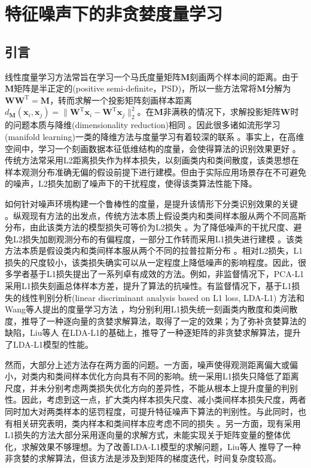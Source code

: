 \chapter{特征噪声下的非贪婪度量学习}\label{chap:2}
\section{引言}
线性度量学习方法常旨在学习一个马氏度量矩阵$\boldsymbol{M}$刻画两个样本间的距离。由于$\boldsymbol{M}$矩阵是半正定的(positive semi-definite，PSD)，所以一些方法常将$\boldsymbol{M}$分解为$\boldsymbol{W}\boldsymbol{W}^\mathrm{T}=\boldsymbol{M}$，转而求解一个投影矩阵刻画样本距离$d_{\boldsymbol{M}}(\boldsymbol{x}_i,\boldsymbol{x}_j)=\|\boldsymbol{W}^\mathrm{T}\boldsymbol{x}_i-\boldsymbol{W}^\mathrm{T}\boldsymbol{x}_j\|_2^2$。在$\boldsymbol{M}$非满秩的情况下，求解投影矩阵$\boldsymbol{W}$时的问题本质与降维(dimensionality reduction)相同 \citep{suvy_DML13,LDR_15jml}。因此很多诸如流形学习(manifold learning)一类的降维方法与度量学习有着较深的联系 \citep{dml_yang}。事实上，在高维空间中，学习一个刻画数据本征低维结构的度量，会使得算法的识别效果更好 \citep{Liao2015,pair17icml}。传统方法常采用L2距离损失作为样本损失，以刻画类内和类间散度，该类思想在样本观测分布准确无偏的假设前提下进行建模。但由于实际应用场景存在不可避免的噪声，L2损失加剧了噪声下的干扰程度，使得该类算法性能下降。

如何针对噪声环境构建一个鲁棒性的度量，是提升该情形下分类识别效果的关键 \citep{Yi2012}。纵观现有方法的出发点，传统方法本质上假设类内和类间样本服从两个不同高斯分布，由此该类方法的模型损失可等价为L2损失 \citep{DavidZhang}。为了降低噪声的干扰尺度、避免L2损失加剧观测分布的有偏程度，一部分工作转而采用L1损失进行建模 \citep{stocL1,niePCAL1}。该类方法本质是假设类内和类间样本服从两个不同的拉普拉斯分布 \citep{zhang2016exploring}。相对L2损失，L1损失的尺度较小，该类损失确实可以从一定程度上降低噪声的影响程度。因此，很多学者基于L1损失提出了一系列卓有成效的方法。例如，非监督情况下，PCA-L1 \citep{pca_L1}采用L1损失刻画总体样本方差，提升了算法的抗噪性。有监督情况下，基于L1损失的线性判别分析(linear discriminant analysis based on L1 loss, LDA-L1) \citep{zhong13}方法和Wang等人提出的度量学习方法 \citep{Wang2014a}，均分别利用L1损失统一刻画类内散度和类间散度，推导了一种逐向量的贪婪求解算法，取得了一定的效果；为了弥补贪婪算法的缺陷，Liu等人 \citep{liu16non}在LDA-L1的基础上，推导了一种逐矩阵的非贪婪求解算法，提升了LDA-L1模型的性能。

然而，大部分上述方法存在两方面的问题。一方面，噪声使得观测距离偏大或偏小，对类内和类间样本优化方向具有不同的影响。统一采用L1损失只降低了距离尺度，并未分别考虑两类损失优化方向的差异性，不能从根本上提升度量的判别性。因此，考虑到这一点，扩大类内样本损失尺度、减小类间样本损失尺度，两者同时加大对两类样本的惩罚程度，可提升特征噪声下算法的判别性。与此同时，也有相关研究表明，类内样本和类间样本应考虑不同的损失 \citep{ye2018lp}。另一方面，现有采用L1损失的方法大部分采用逐向量的求解方式，未能实现关于矩阵变量的整体优化，求解效果不够理想。为了改善LDA-L1模型的求解问题，Liu等人 \citep{liu16non}推导了一种非贪婪的求解算法，但该方法是涉及到矩阵的梯度迭代，时间复杂度较高。

